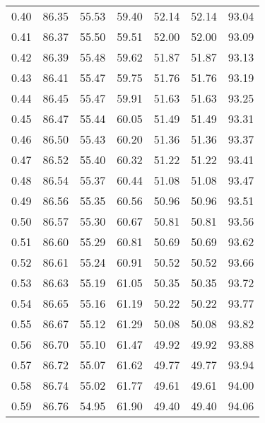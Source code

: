 \begin{tabular}{|c|c|c|c|c|c|c|}
      0.40 &     86.35 &     55.53 &      59.40 &   52.14 &      52.14 &         93.04 \\
      0.41 &     86.37 &     55.50 &      59.51 &   52.00 &      52.00 &         93.09 \\
      0.42 &     86.39 &     55.48 &      59.62 &   51.87 &      51.87 &         93.13 \\
      0.43 &     86.41 &     55.47 &      59.75 &   51.76 &      51.76 &         93.19 \\
      0.44 &     86.45 &     55.47 &      59.91 &   51.63 &      51.63 &         93.25 \\
      0.45 &     86.47 &     55.44 &      60.05 &   51.49 &      51.49 &         93.31 \\
      0.46 &     86.50 &     55.43 &      60.20 &   51.36 &      51.36 &         93.37 \\
      0.47 &     86.52 &     55.40 &      60.32 &   51.22 &      51.22 &         93.41 \\
      0.48 &     86.54 &     55.37 &      60.44 &   51.08 &      51.08 &         93.47 \\
      0.49 &     86.56 &     55.35 &      60.56 &   50.96 &      50.96 &         93.51 \\
      0.50 &     86.57 &     55.30 &      60.67 &   50.81 &      50.81 &         93.56 \\
      0.51 &     86.60 &     55.29 &      60.81 &   50.69 &      50.69 &         93.62 \\
      0.52 &     86.61 &     55.24 &      60.91 &   50.52 &      50.52 &         93.66 \\
      0.53 &     86.63 &     55.19 &      61.05 &   50.35 &      50.35 &         93.72 \\
      0.54 &     86.65 &     55.16 &      61.19 &   50.22 &      50.22 &         93.77 \\
      0.55 &     86.67 &     55.12 &      61.29 &   50.08 &      50.08 &         93.82 \\
      0.56 &     86.70 &     55.10 &      61.47 &   49.92 &      49.92 &         93.88 \\
      0.57 &     86.72 &     55.07 &      61.62 &   49.77 &      49.77 &         93.94 \\
      0.58 &     86.74 &     55.02 &      61.77 &   49.61 &      49.61 &         94.00 \\
      0.59 &     86.76 &     54.95 &      61.90 &   49.40 &      49.40 &         94.06 \\

\end{tabular}
